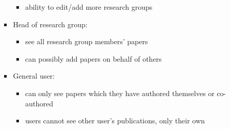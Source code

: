\documentclass{article}
\begin{document}
\begin{itemize}
\begin{itemize}
\begin{itemize}
\begin{itemize}
					\item ability to edit/add more research groups
				\end{itemize}
				\item Head of research group:
				\begin{itemize}
					\item see all research group members' papers
					\item can possibly add papers on behalf of others
				\end{itemize}
				\item General user:
				\begin{itemize}
					\item can only see papers which they have authored themselves or co-authored
					\item users cannot see other user's publications, only their own
				\end{itemize}
			\end{itemize}
		\end{itemize}
	\end{itemize}
\end{document}
